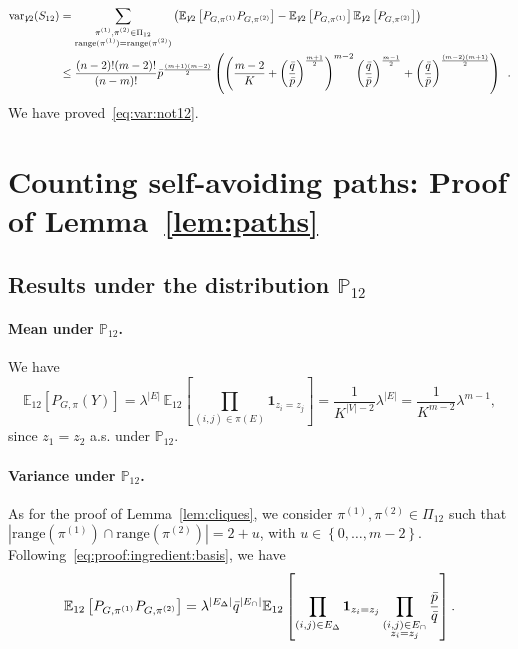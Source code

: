 \documentclass[final]{colt2026}
\newcommand{\1}{\mathbf{1}}
\newcommand{\bbE}{\mathbb{E}}
\newcommand{\bbP}{\mathbb{P}}
\newcommand{\pa}[1]{\left(#1\right)}
\newcommand{\ac}[1]{\left\{#1\right\}}
\newcommand{\cro}[1]{\left[#1\right]}
\begin{document}
\begin{align}
\text{var}_{\not 12}(S_{12}) &=  \sum_{\substack{\pi^{(1)},\pi^{(2)}\in \Pi_{12}\\ \text{range}(\pi^{(1)})= \text{range}(\pi^{(2)})}}
\pa{\bbE_{\not 12}\cro{P_{G,\pi^{(1)}}P_{G,\pi^{(2)}}}-\bbE_{\not 12}\cro{P_{G,\pi^{(1)}}}\bbE_{\not 12}\cro{P_{G,\pi^{(2)}}}}\nonumber\\
& \leq {(n-2)! (m-2)!\over (n-m)!} \bar p^{(m+1)(m-2)\over 2} \pa{\pa{{m-2 \over K}+\pa{\bar q\over \bar p}^{{m+1\over 2}}}^{m-2} \pa{\bar q\over \bar p}^{{m-1\over 2}}+ \pa{\bar q\over \bar p}^{{(m-2)(m+1)\over 2}} }\enspace . \nonumber
\end{align}
We  have proved~\eqref{eq:var:not12}.




\section{Counting self-avoiding paths: Proof of Lemma~\ref{lem:paths}}\label{sec:lem:paths}


\subsection{Results under the distribution $\bbP_{12}$}

\paragraph{Mean under $\bbP_{12}$.}
We have
\begin{equation*}
\bbE_{12}\cro{P_{G,\pi}(Y)}= \lambda^{|E|} \,\bbE_{ 12}\cro{\prod_{(i,j)\in \pi(E)}\mathbf 1_{z_{i}=z_{j}}}= \frac{1}{K^{|V|-2}} \lambda^{|E|} = \frac{1}{K^{m-2}} \lambda^{m-1},
\end{equation*}
since $z_{1}= z_{2}$ a.s. under  $\bbP_{12}$. 




\paragraph{Variance under $\bbP_{12}$.} As for the proof of Lemma~\ref{lem:cliques}, we consider $\pi^{(1)},\pi^{(2)}\in \Pi_{12}$ such that $|\text{range}(\pi^{(1)})\cap \text{range}(\pi^{(2)})|=2+u$, with $u\in \ac{0,\ldots,m-2}$.
Following~\eqref{eq:proof:ingredient:basis}, we have 
$$\bbE_{12}\cro{P_{G,\pi^{(1)}}P_{G,\pi^{(2)}}}=\lambda^{|E_{\Delta}|} \bar q^{|E_{\cap}|} \bbE_{12}\cro{\prod_{(i,j)\in E_{\Delta}}\mathbf 1_{z_{i}=z_{j}}\prod_{\substack{(i,j)\in E_{\cap}\\ z_{i}=z_{j}}}{\bar p\over \bar q}}.$$
\smallskip
\end{document}
